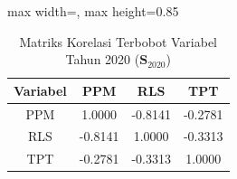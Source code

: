 \begin{table}[H]
\centering
\caption{Matriks Korelasi Terbobot Variabel Tahun 2020 ($\mathbf{S}_{2020}$)} \makeatletter{}\makeatother
\begin{adjustbox}{max width=\textwidth, max height=0.85\textheight}
\begin{tabular}{|c|c|c|c|}
\hline
\textbf{Variabel} & \textbf{PPM} & \textbf{RLS} & \textbf{TPT} \\
\hline
PPM & 1.0000 & -0.8141 & -0.2781 \\
RLS & -0.8141 & 1.0000 & -0.3313 \\
TPT & -0.2781 & -0.3313 & 1.0000 \\
\hline
\end{tabular}
\end{adjustbox}
\end{table}